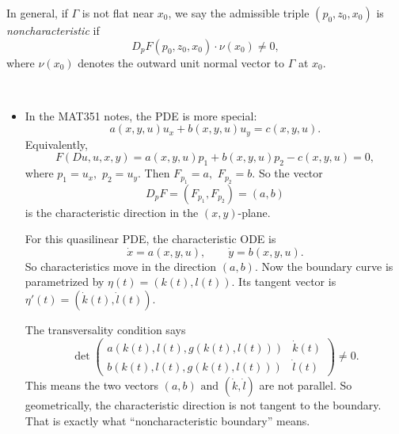 \begin{definition}
In general, if $\Gamma$ is not flat near $x_0$, we say the admissible triple
$
(p_0,z_0,x_0)
$
is \emph{noncharacteristic} if
$$
D_pF(p_0,z_0,x_0)\cdot \nu(x_0)\neq 0,
$$
where $\nu(x_0)$ denotes the outward unit normal vector to $\Gamma$ at $x_0$.
\end{definition}
\begin{remark}\
    \begin{itemize}
        \item In the MAT351 notes, the PDE is more special:
        $$
        a(x,y,u)u_x+b(x,y,u)u_y=c(x,y,u).
        $$
        Equivalently,
        $$
        F(Du,u,x,y)
        =
        a(x,y,u)p_1+b(x,y,u)p_2-c(x,y,u)=0,
        $$
        where
        $
        p_1=u_x,
        $
        $
        p_2=u_y.
        $
        Then
        $
        F_{p_1}=a,$
        $
        F_{p_2}=b.
        $
        So the vector
        $$
        D_pF=(F_{p_1},F_{p_2})=(a,b)
        $$
        is the characteristic direction in the $(x,y)$-plane.
        
        For this quasilinear PDE, the characteristic ODE is
        $$
        \dot{x}=a(x,y,u),
        \qquad
        \dot{y}=b(x,y,u).
        $$
        So characteristics move in the direction
        $
        (a,b).
        $
        Now the boundary curve is parametrized by
        $
        \eta(t)=(k(t),l(t)).
        $
        Its tangent vector is
        $
        \eta'(t)=(\dot{k}(t),\dot{l}(t)).
        $

        The transversality condition says
        $$
        \det
        \begin{pmatrix}
        a(k(t),l(t),g(k(t),l(t))) & \dot{k}(t)\\
        b(k(t),l(t),g(k(t),l(t))) & \dot{l}(t)
        \end{pmatrix}
        \neq 0.
        $$
        This means the two vectors
        $
        (a,b)
        \text{ and }
        (\dot{k},\dot{l})
        $
        are not parallel.
        So geometrically, the characteristic direction is not tangent to the boundary.
        That is exactly what ``noncharacteristic boundary'' means.
    \end{itemize}

\end{remark}